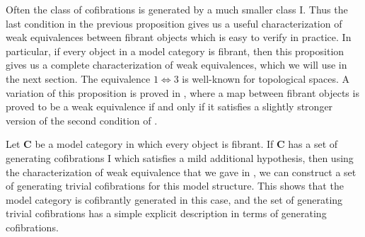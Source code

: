 \documentclass{tac}
\theoremstyle{definition}
\newcommand{\cat}[1]{\mathbf{#1}}
\newcommand{\C}{\cat{C}}
\newcommand{\I}{\mathrm{I}}
\begin{document}
Often the class of cofibrations is generated by a much smaller class $\I$.
Thus the last condition in the previous proposition gives us a useful characterization of weak equivalences between fibrant objects which is easy to verify in practice.
In particular, if every object in a model category is fibrant, then this proposition gives us a complete characterization of weak equivalences, which we will use in the next section.
The equivalence $1 \Leftrightarrow 3$ is well-known for topological spaces.
A variation of this proposition is proved in \cite{vogt-we},
where a map between fibrant objects is proved to be a weak equivalence if and only if it satisfies a slightly stronger version of the second condition of .

Let $\C$ be a model category in which every object is fibrant.
If $\C$ has a set of generating cofibrations $\I$ which satisfies a mild additional hypothesis, then using the characterization of weak equivalence that we gave in ,
we can construct a set of generating trivial cofibrations for this model structure.
This shows that the model category is cofibrantly generated in this case,
and the set of generating trivial cofibrations has a simple explicit description in terms of generating cofibrations.
\end{document}
